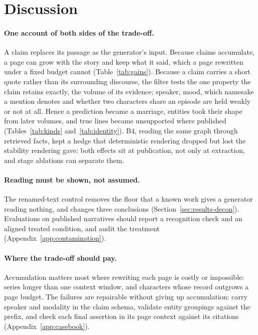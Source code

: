 \section{Discussion}
\label{sec:discussion}

\paragraph{One account of both sides of the trade-off.}
A claim replaces its passage as the generator's input. Because claims accumulate, a page
can grow with the story and keep what it said, which a page rewritten under a fixed budget
cannot (Table~\ref{tab:gains}). Because a claim carries a short quote rather than its
surrounding discourse, the filter tests the one property the claim retains exactly, the
volume of its evidence; speaker, mood, which
namesake a mention denotes and whether two characters share an episode are held weakly or
not at all. Hence a prediction became a marriage, entities took their shape from later
volumes, and true lines became unsupported where published (Tables~\ref{tab:kinds}
and~\ref{tab:identity}). B4, reading the same graph through retrieved facts, kept a hedge
that deterministic rendering dropped but lost the stability rendering gave: both effects
sit at publication, not only at extraction, and stage ablations can separate them.

\paragraph{Reading must be shown, not assumed.}
The renamed-text control removes the floor that a known work gives a generator reading
nothing, and changes three conclusions (Section~\ref{sec:results-decon}). Evaluations on
published narratives should report a recognition check and an aligned
treated condition, and audit the treatment (Appendix~\ref{app:contamination}).

\paragraph{Where the trade-off should pay.}
Accumulation matters most where rewriting each page is costly or impossible: series longer
than one context window, and characters whose record outgrows a page budget. The failures
are repairable without giving up accumulation: carry speaker and modality in the claim
schema, validate entity groupings against the prefix, and check each final assertion in
its page context against its citations (Appendix~\ref{app:casebook}).
